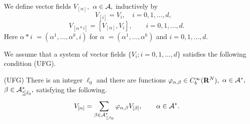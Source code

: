 \documentclass[12pt]{article}
\begin{document}
We define vector fields $V_{[\alpha ]},$ $\alpha \in {\cal A},$ 
inductively by
$$
\qquad V_{[i]} = V_i, 
\quad i = 0,1,\ldots ,d,
$$
$$
V_{[\alpha *i]} = [V_{[\alpha ]},V_i], 
\qquad i = 0,1,\ldots ,d.
$$
Here $\alpha *i$ 
$= (\alpha^1,\ldots ,\alpha^k,i)$
for $\alpha $ $= (\alpha^1,\ldots ,\alpha^k)$ and $i = 0,1,\ldots ,d.$

We assume that a system of vector fields $\{ V_i ; i=0,1,\ldots ,d \}$ 
satisfies the following condition (UFG).

\noindent
(UFG) There is an integer $\ell_0$ 
and there are functions $\varphi_{\alpha,\beta} \in C^{\infty}_b({\bf R}^N),$ 
$\alpha \in {\cal A}^{*},$ $\beta \in {\cal A}^{*}_{\leqq \ell_0},$ 
satisfying the following.
$$
{\displaystyle V_{[\alpha ]} 
= \sum_{\beta \in {\cal A}^{*}_{\leqq \ell_0}}
\varphi_{\alpha,\beta}V_{[\beta ]}},
\qquad 
\alpha \in {\cal A}^{*}.
$$
\end{document}
